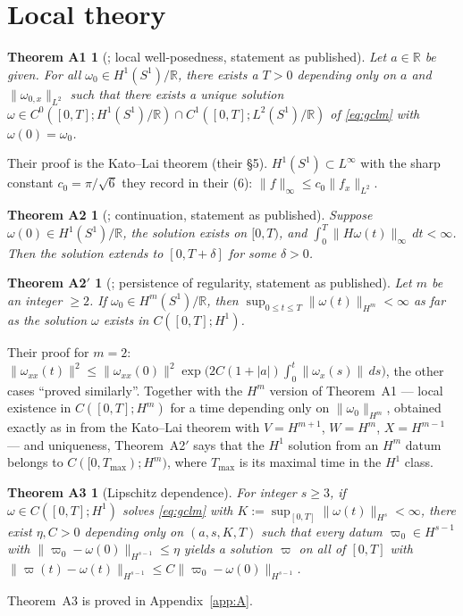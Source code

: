 \documentclass[11pt,a4paper]{article}
\theoremstyle{plain}
\theoremstyle{definition}
\theoremstyle{plain}
\newtheorem*{thmAone}{Theorem A1}
\newtheorem*{thmAtwo}{Theorem A2}
\newtheorem*{thmAtwoprime}{Theorem A2$'$}
\newtheorem*{thmAthree}{Theorem A3}
\newcommand{\R}{\mathbb{R}}
\newcommand{\Sone}{S^1}
\newcommand{\nrm}[1]{\lVert #1 \rVert}
\newcommand{\abs}[1]{\lvert #1 \rvert}
\begin{document}
\section{Local theory}\label{sec:local}

\begin{thmAone}[{\cite[Theorem~3.1]{OSW08}}; local well-posedness, statement as published]
Let $a\in\R$ be given. For all $\omega_0\in H^1(\Sone)/\R$, there exists a $T>0$ depending only on $a$ and $\nrm{\omega_{0,x}}_{L^2}$ such that there exists a unique solution $\omega\in C^0([0,T];H^1(\Sone)/\R)\cap C^1([0,T];L^2(\Sone)/\R)$ of \eqref{eq:gclm} with $\omega(0)=\omega_0$.
\end{thmAone}
\noindent Their proof is the Kato--Lai theorem (their \S5). $H^1(\Sone)\subset L^\infty$ with the sharp constant $c_0=\pi/\sqrt6$ they record in their (6): $\nrm{f}_\infty\le c_0\nrm{f_x}_{L^2}$.

\begin{thmAtwo}[{\cite[Theorem~3.2]{OSW08}}; continuation, statement as published]
Suppose $\omega(0)\in H^1(\Sone)/\R$, the solution exists on $[0,T)$, and $\int_0^T\nrm{H\omega(t)}_\infty\,dt<\infty$. Then the solution extends to $[0,T+\delta]$ for some $\delta>0$.
\end{thmAtwo}

\begin{thmAtwoprime}[{\cite[Proposition~5.1]{OSW08}}; persistence of regularity, statement as published]
Let $m$ be an integer $\ge2$. If $\omega_0\in H^m(\Sone)/\R$, then $\sup_{0\le t\le T}\nrm{\omega(t)}_{H^m}<\infty$ as far as the solution $\omega$ exists in $C([0,T];H^1)$.
\end{thmAtwoprime}
\noindent Their proof for $m=2$: $\nrm{\omega_{xx}(t)}^2\le\nrm{\omega_{xx}(0)}^2\exp\big(2C(1+\abs{a})\int_0^t\nrm{\omega_x(s)}\,ds\big)$, the other cases ``proved similarly''. Together with the $H^m$ version of Theorem~A1 --- local existence in $C([0,T];H^m)$ for a time depending only on $\nrm{\omega_0}_{H^m}$, obtained exactly as in \cite[\S5]{OSW08} from the Kato--Lai theorem with $V=H^{m+1}$, $W=H^m$, $X=H^{m-1}$ --- and uniqueness, Theorem~A2$'$ says that the $H^1$ solution from an $H^m$ datum belongs to $C([0,T_{\max});H^m)$, where $T_{\max}$ is its maximal time in the $H^1$ class.

\begin{thmAthree}[Lipschitz dependence]
For integer $s\ge3$, if $\omega\in C([0,T];H^1)$ solves \eqref{eq:gclm} with $K:=\sup_{[0,T]}\nrm{\omega(t)}_{H^s}<\infty$, there exist $\eta,C>0$ depending only on $(a,s,K,T)$ such that every datum $\varpi_0\in H^{s-1}$ with $\nrm{\varpi_0-\omega(0)}_{H^{s-1}}\le\eta$ yields a solution $\varpi$ on all of $[0,T]$ with $\nrm{\varpi(t)-\omega(t)}_{H^{s-1}}\le C\nrm{\varpi_0-\omega(0)}_{H^{s-1}}$.
\end{thmAthree}
\noindent Theorem~A3 is proved in Appendix~\ref{app:A}.
\end{document}

